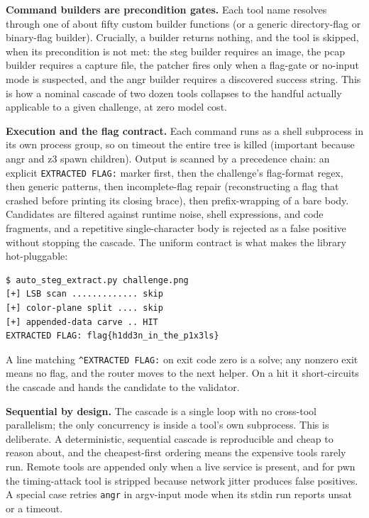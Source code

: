 \documentclass[10pt,twocolumn]{article}
\begin{document}
\medskip
\textbf{Command builders are precondition gates.} Each tool name resolves through one of about fifty
custom builder functions (or a generic directory-flag or binary-flag builder). Crucially, a builder
returns nothing, and the tool is skipped, when its precondition is not met: the steg builder requires an
image, the pcap builder requires a capture file, the patcher fires only when a flag-gate or no-input mode
is suspected, and the angr builder requires a discovered success string. This is how a nominal cascade of
two dozen tools collapses to the handful actually applicable to a given challenge, at zero model cost.

\medskip
\textbf{Execution and the flag contract.} Each command runs as a shell subprocess in its own process
group, so on timeout the entire tree is killed (important because angr and z3 spawn children). Output is
scanned by a precedence chain: an explicit \texttt{EXTRACTED FLAG:} marker first, then the challenge's
flag-format regex, then generic patterns, then incomplete-flag repair (reconstructing a flag that crashed
before printing its closing brace), then prefix-wrapping of a bare body. Candidates are filtered against
runtime noise, shell expressions, and code fragments, and a repetitive single-character body is rejected
as a false positive without stopping the cascade. The uniform contract is what makes the library
hot-pluggable:

\begin{Verbatim}[frame=single,fontsize=\small,framesep=4pt,samepage=true]
$ auto_steg_extract.py challenge.png
[+] LSB scan ............. skip
[+] color-plane split .... skip
[+] appended-data carve .. HIT
EXTRACTED FLAG: flag{h1dd3n_in_the_p1x3ls}
\end{Verbatim}

\noindent A line matching \texttt{\textasciicircum{}EXTRACTED FLAG:} on exit code zero is a solve; any
nonzero exit means no flag, and the router moves to the next helper. On a hit it short-circuits the
cascade and hands the candidate to the validator.

\medskip
\textbf{Sequential by design.} The cascade is a single loop with no cross-tool parallelism; the only
concurrency is inside a tool's own subprocess. This is deliberate. A deterministic, sequential cascade is
reproducible and cheap to reason about, and the cheapest-first ordering means the expensive tools rarely
run. Remote tools are appended only when a live service is present, and for pwn the timing-attack tool is
stripped because network jitter produces false positives. A special case retries \texttt{angr} in
argv-input mode when its stdin run reports unsat or a timeout.
\end{document}

